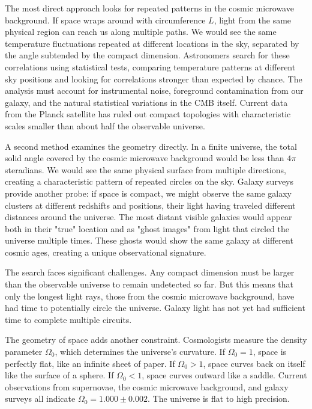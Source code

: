 The most direct approach looks for repeated patterns in the cosmic microwave background. If space wraps around with circumference $L$, light from the same physical region can reach us along multiple paths. We would see the same temperature fluctuations repeated at different locations in the sky, separated by the angle subtended by the compact dimension. Astronomers search for these correlations using statistical tests, comparing temperature patterns at different sky positions and looking for correlations stronger than expected by chance. The analysis must account for instrumental noise, foreground contamination from our galaxy, and the natural statistical variations in the CMB itself. Current data from the Planck satellite has ruled out compact topologies with characteristic scales smaller than about half the observable universe.

A second method examines the geometry directly. In a finite universe, the total solid angle covered by the cosmic microwave background would be less than $4\pi$ steradians. We would see the same physical surface from multiple directions, creating a characteristic pattern of repeated circles on the sky. Galaxy surveys provide another probe: if space is compact, we might observe the same galaxy clusters at different redshifts and positions, their light having traveled different distances around the universe. The most distant visible galaxies would appear both in their "true" location and as "ghost images" from light that circled the universe multiple times. These ghosts would show the same galaxy at different cosmic ages, creating a unique observational signature.

The search faces significant challenges. Any compact dimension must be larger than the observable universe to remain undetected so far. But this means that only the longest light rays, those from the cosmic microwave background, have had time to potentially circle the universe. Galaxy light has not yet had sufficient time to complete multiple circuits.

The geometry of space adds another constraint. Cosmologists measure the density parameter $\Omega_0$, which determines the universe's curvature. If $\Omega_0 = 1$, space is perfectly flat, like an infinite sheet of paper. If $\Omega_0 > 1$, space curves back on itself like the surface of a sphere. If $\Omega_0 < 1$, space curves outward like a saddle. Current observations from supernovae, the cosmic microwave background, and galaxy surveys all indicate $\Omega_0 = 1.000 \pm 0.002$. The universe is flat to high precision.


